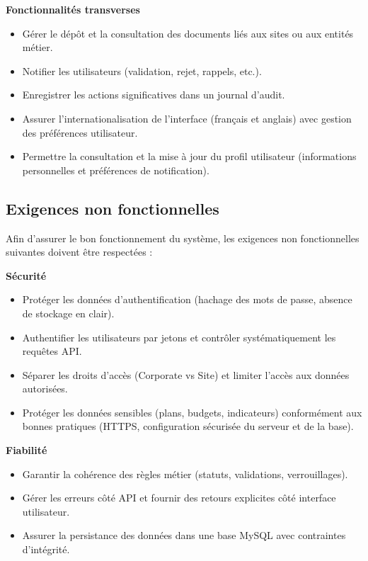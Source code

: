 \textbf{Fonctionnalités transverses}
\begin{itemize}[label=\textbullet]
  \item Gérer le dépôt et la consultation des documents liés aux sites ou aux entités métier.
  \item Notifier les utilisateurs (validation, rejet, rappels, etc.).
  \item Enregistrer les actions significatives dans un journal d’audit.
  \item Assurer l’internationalisation de l’interface (français et anglais) avec gestion des préférences utilisateur.
  \item Permettre la consultation et la mise à jour du profil utilisateur (informations personnelles et préférences de notification).
\end{itemize}

\subsection{Exigences non fonctionnelles}

Afin d’assurer le bon fonctionnement du système, les exigences non fonctionnelles suivantes doivent être respectées :

\textbf{Sécurité}

\begin{itemize}[label=\textbullet]
  \item Protéger les données d’authentification (hachage des mots de passe, absence de stockage en clair).
  \item Authentifier les utilisateurs par jetons et contrôler systématiquement les requêtes API.
  \item Séparer les droits d’accès (Corporate vs Site) et limiter l’accès aux données autorisées.
  \item Protéger les données sensibles (plans, budgets, indicateurs) conformément aux bonnes pratiques (HTTPS, configuration sécurisée du serveur et de la base).
\end{itemize}

\textbf{Fiabilité}

\begin{itemize}[label=\textbullet]
  \item Garantir la cohérence des règles métier (statuts, validations, verrouillages).
  \item Gérer les erreurs côté API et fournir des retours explicites côté interface utilisateur.
  \item Assurer la persistance des données dans une base MySQL avec contraintes d’intégrité.
\end{itemize}

